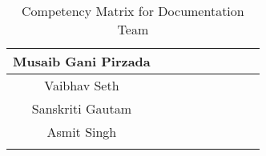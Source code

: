 \begin{center}
\begin{longtable}{|c|c|c|c|c|c|p{1.2cm}|c|c|}
Musaib Gani Pirzada     & \cellcolor[HTML]{00B050} & \cellcolor[HTML]{FFFF00} & \cellcolor[HTML]{FFFF00} & \cellcolor[HTML]{92D050} & \cellcolor[HTML]{FFFF00} & \cellcolor[HTML]{00B050} & \cellcolor[HTML]{FFC000} & \cellcolor[HTML]{FFC000} \\ \hline
Vaibhav Seth            & \cellcolor[HTML]{00B050} & \cellcolor[HTML]{92D050} & \cellcolor[HTML]{FFFF00} & \cellcolor[HTML]{92D050} & \cellcolor[HTML]{D9D9D9} & \cellcolor[HTML]{D9D9D9} & \cellcolor[HTML]{FFC000} & \cellcolor[HTML]{D9D9D9} \\ \hline
Sanskriti Gautam        & \cellcolor[HTML]{FFFF00} & \cellcolor[HTML]{92D050} & \cellcolor[HTML]{FFFF00} & \cellcolor[HTML]{FFFF00} & \cellcolor[HTML]{FFC000} & \cellcolor[HTML]{FFC000} & \cellcolor[HTML]{D9D9D9} & \cellcolor[HTML]{D9D9D9} \\ \hline
Asmit Singh             & \cellcolor[HTML]{92D050} & \cellcolor[HTML]{FFFF00} & \cellcolor[HTML]{00B050} & \cellcolor[HTML]{FFFF00} & \cellcolor[HTML]{D9D9D9} & \cellcolor[HTML]{D9D9D9} & \cellcolor[HTML]{D9D9D9} & \cellcolor[HTML]{D9D9D9} \\ \hline
\caption{Competency Matrix for Documentation Team}
\end{longtable}
\setlength\LTleft{0cm}
\end{center}


